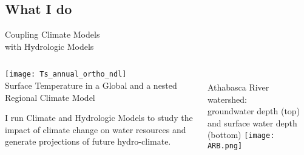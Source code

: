 \documentclass[hyperref={pdfpagelabels=false},compress,final]{beamer}
\newenvironment{myBox}[3][shadow=true]%
{\begin{center} \begin{minipage}{#2} \begin{beamerboxesrounded}[#1]{#3} \smallskip}%
      {\smallskip \end{beamerboxesrounded} \end{minipage} \end{center}}
\begin{document}
\subsection{What I do}

\begin{frame}{\hspace{0.55\textwidth} Coupling Climate Models\\ \hspace*{0.55\textwidth} with Hydrologic Models}
  \begin{columns}
    \begin{column}{0.5\textwidth}
      \vspace*{-1.5cm}
      \texttt{[image: Ts\_annual\_ortho\_ndl]}\\
      {\scriptsize Surface Temperature in a Global and a nested Regional Climate Model}
      \begin{myBox}{0.95\textwidth}{}
        \footnotesize I run Climate and Hydrologic Models to study the impact of climate change on water resources and generate projections of future hydro-climate.
      \end{myBox}
    \end{column}
    \begin{column}{0.5\textwidth}
      \vspace*{.25cm}\\
      \scriptsize Athabasca River watershed: \\ groundwater depth (top) and surface water depth (bottom)
      \texttt{[image: ARB.png]}
    \end{column}
  \end{columns}
\end{frame}
\end{document}
